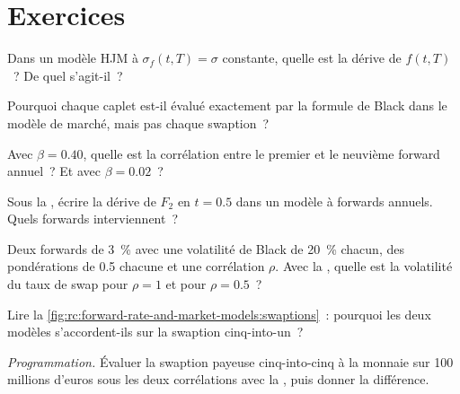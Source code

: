 \section{Exercices}

\begin{exercise}[$\star$]\label{exo:rc:forward-rate-and-market-models:1}
Dans un modèle HJM à $\sigma_f(t,T)=\sigma$ constante, quelle est la dérive de $f(t,T)$~?
De quel  s'agit-il~?
\end{exercise}

\begin{exercise}[$\star$]\label{exo:rc:forward-rate-and-market-models:2}
Pourquoi chaque caplet est-il évalué exactement par la formule de Black dans le modèle de marché,
mais pas chaque swaption~?
\end{exercise}

\begin{exercise}[$\star$]\label{exo:rc:forward-rate-and-market-models:3}
Avec $\beta = 0.40$, quelle est la corrélation entre le premier et le neuvième
forward annuel~? Et avec $\beta=0.02$~?
\end{exercise}

\begin{exercise}[$\star\star$]\label{exo:rc:forward-rate-and-market-models:4}
Sous la , écrire la dérive de $F_2$ en $t=0.5$ dans un modèle à
forwards annuels. Quels forwards interviennent~?
\end{exercise}

\begin{exercise}[$\star\star$]\label{exo:rc:forward-rate-and-market-models:5}
Deux forwards de 3~\% avec une volatilité de Black de 20~\% chacun, des pondérations de 0.5 chacune et
une corrélation $\rho$. Avec la , quelle est la volatilité du taux de swap pour
$\rho=1$ et pour $\rho=0.5$~?
\end{exercise}

\begin{exercise}[$\star\star$]\label{exo:rc:forward-rate-and-market-models:6}
Lire la \cref{fig:rc:forward-rate-and-market-models:swaptions}~: pourquoi les deux modèles
s'accordent-ils sur la swaption cinq-into-un~?
\end{exercise}

\begin{exercise}[$\star\star\star$]\label{exo:rc:forward-rate-and-market-models:7}
\emph{Programmation.} Évaluer la swaption payeuse cinq-into-cinq à la monnaie sur 100 millions d'euros sous
les deux corrélations avec la , puis donner la différence.
\end{exercise}

